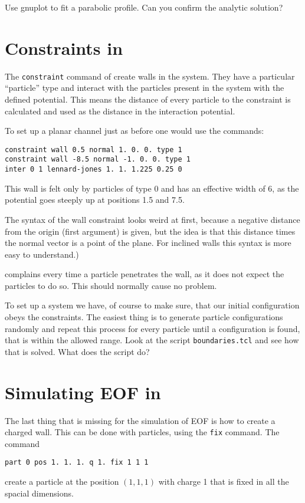 Use gnuplot to fit a parabolic profile. Can you confirm the analytic solution?

\section{Constraints in \ES{}}
The \lstinline|constraint| command of \ES{} create walls in the system.
They have a particular ``particle'' type and interact with the particles
present in the system with the defined potential. This means the distance
of every particle to the constraint is calculated and used as the distance 
in the interaction potential.

To set up a planar channel just as before one would use the commands:
\begin{lstlisting}[numbers=none]
constraint wall 0.5 normal 1. 0. 0. type 1
constraint wall -8.5 normal -1. 0. 0. type 1
inter 0 1 lennard-jones 1. 1. 1.225 0.25 0
\end{lstlisting}
This wall is felt only by particles of type 0 and has an effective width
of 6, as the potential goes steeply up at positions 1.5 and 7.5.

The syntax of the wall constraint looks weird at first, because a negative
distance from the origin (first argument) is given, but the idea is that
this distance times the normal vector is a point of the plane. For inclined
walls this syntax is more easy to understand.)

\ES{} complains every time a particle penetrates the wall, as it does not
expect the particles to do so. This should normally cause no problem. 

To set up a system we have, of course to make sure, that our initial
configuration obeys the constraints. The easiest thing is to 
generate particle configurations randomly and repeat this process
for every particle until a configuration is found, that
is within the allowed range. Look at the script \lstinline|boundaries.tcl|
and see how that is solved. What does the script do?

\section{Simulating EOF in \ES{}}
The last thing that is missing for the simulation of EOF is
how to create a charged wall. This can be done with
particles, using the \lstinline|fix| command. The command
\begin{lstlisting}[numbers=none]
part 0 pos 1. 1. 1. q 1. fix 1 1 1
\end{lstlisting}
create a particle at the position $\left(1,1,1\right)$ with
charge 1 that is fixed in all the spacial dimensions.

